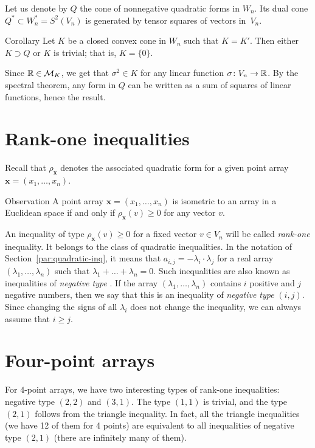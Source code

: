 \documentclass[a4paper,10pt]{article}
\begin{document}
Let us denote by $Q$ the cone of nonnegative quadratic forms in $W_n$.
Its dual cone $Q^*\subset W_n^*=S^2(V_n)$ is generated by tensor squares of vectors in~$V_n$.

\begin{thm}{Corollary}
Let $K$ be a closed convex cone in $W_n$ such that $K=K'$.
Then either $K\supset Q$ or $K$ is trivial; that is, $K=\{0\}$.
\end{thm}

Since $\mathbb{R}\in \mathcal{M}_K$, we get that $\sigma^2\in K$ for any linear function $\sigma\colon V_n\to\mathbb{R}$.
By the spectral theorem, any form in $Q$ can be written as a sum of squares of linear functions, hence the result.
\qeds

\section{Rank-one inequalities}\label{par:rank-one}
Recall that $\rho_{\bm{x}}$ denotes the associated quadratic form for a given point array $\bm{x}=(x_1,\dots,x_n)$.

\begin{thm}{Observation}\label{obs:rank-one}
A point array $\bm{x}=(x_1,\dots,x_n)$ is isometric to an array in a Euclidean space if and only if $\rho_{\bm{x}}(v)\ge 0$ for any vector $v$.
\end{thm}

An inequality of type $\rho_{\bm{x}}(v)\ge 0$ for a fixed vector $v\in V_n$ will be called \emph{rank-one} inequality.
It belongs to the class of quadratic inequalities.  
In the notation of Section~\ref{par:quadratic-inq}, it means that $a_{i,j}=-\lambda_i\cdot\lambda_j$ for a real array $(\lambda_1,\dots, \lambda_n)$ such that
$\lambda_1+\dots+\lambda_n=0$.
Such inequalities are also known as inequalities of \emph{negative type} \cite{deza-lauren}.
If the array $(\lambda_1,\dots, \lambda_n)$ contains $i$ positive and $j$ negative numbers,
then we say that this is an inequality of \emph{negative type} $(i,j)$.
Since changing the signs of all $\lambda_i$ does not change the inequality, we can always assume that $i\ge j$.

\section{Four-point arrays}\label{Four-point arrays}

For $4$-point arrays, we have two interesting types of rank-one inequalities: negative type $(2,2)$ and $(3,1)$.
The type $(1,1)$ is trivial, and
the type $(2,1)$ follows from the triangle inequality.
In fact, all the triangle inequalities (we have 12 of them for 4 points) are equivalent to all inequalities of negative type $(2,1)$ (there are infinitely many of them).
\end{document}
